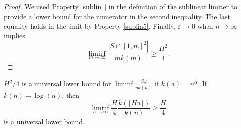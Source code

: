 \documentclass[11pt,a4paper]{article}
\numberwithin{equation}{section}
\begin{document}
\begin{proof}
We used Property \ref{sublin1} in the definition of the sublinear limiter to provide a lower bound for the numerator in the second inequality. The last equality holds in the limit by Property \ref{sublin5}. Finally, $\varepsilon \to 0$ when $n\to \infty$ implies
$$\liminf_{m\to\infty} \frac{\left|S \cap [1,m]^2\right|}{m k(m)}\ge \frac{H^2}{4}.$$


\end{proof}


\begin{corollary}

$H^2/4$ is a universal lower bound for $\liminf \frac{|S_n|} {nk(n)}$ if $k(n)=n^{\alpha}$. If $k(n) = \log (n)$, then
$$\liminf_{n\to\infty} \frac{H}{4} \frac{k(\lfloor Hn\rfloor)}{k(n)}\ge\frac{H}{4}$$
is a universal lower bound.


\end{corollary}


    
{
    \footnotesize
    
    
	
    
}
\end{document}
